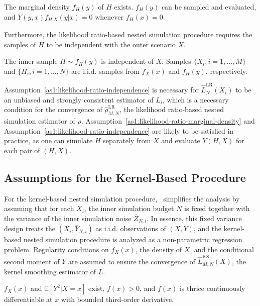 \begin{assumption}\label{as1:likelihood-ratio-marginal-density}
    The marginal density $f_H(y)$ of $H$ exists. $f_H(y)$ can be sampled and evaluated, and $Y(y, x) f_{H|X}(y|x) = 0$ whenever $f_H(x) = 0$. 
\end{assumption}

Furthermore, the likelihood ratio-based nested simulation procedure requires the samples of $H$ to be independent with the outer scenario $X$.

\begin{assumption}\label{as1:likelihood-ratio-independence}
    The inner sample $H \sim f_H(y)$ is independent of $X$. Samples $\{X_i, i=1,\ldots,M\}$ and $\{H_i, i=1,\ldots,N\}$ are i.i.d. samples from $f_X(x)$ and $f_H(y)$, respectively.
\end{assumption}

Assumption~\ref{as1:likelihood-ratio-independence} is necessary for $\hat{L}^{\text{LR}}_N(X_i)$ to be an unbiased and strongly consistent estimator of $L_i$, which is a necessary condition for the convergence of $\hat{\rho}^{\text{LR}}_{M,N}$, the likelihood ratio-based nested simulation estimator of $\rho$.
Assumption~\ref{as1:likelihood-ratio-marginal-density} and Assumption~\ref{as1:likelihood-ratio-independence} are likely to be satisfied in practice, as one can simulate $H$ separately from $X$ and evaluate $Y(H, X)$ for each pair of $(H, X)$.

\subsection{Assumptions for the Kernel-Based Procedure}
For the kernel-based nested simulation procedure,~\cite{hong2017kernel} simplifies the analysis by assuming that for each $X_i$, the inner simulation budget $N$ is fixed together with the variance of the inner simulation noise $\bar{Z}_{N, i}$.
In essence, this fixed variance design treats the $(X_i, \bar{Y}_{N, i})$ as i.i.d. observations of $(X, Y)$, and the kernel-based nested simulation procedure is analyzed as a non-parametric regression problem.
Regularity conditions on $f_X(x)$, the density of $X$, and the conditional second moment of $Y$ are assumed to ensure the convergence of $\hat{L}^{\text{KS}}_{M, N}(X)$, the kernel smoothing estimator of $L$.

\begin{assumption}
    $f_X(x)$ and $\mathbb{E} \left[ Y^2 | X = x \right]$ exist, $f(x) > 0$, and $f(x)$ is thrice continuously differentiable at $x$ with bounded third-order derivative.
\end{assumption}

